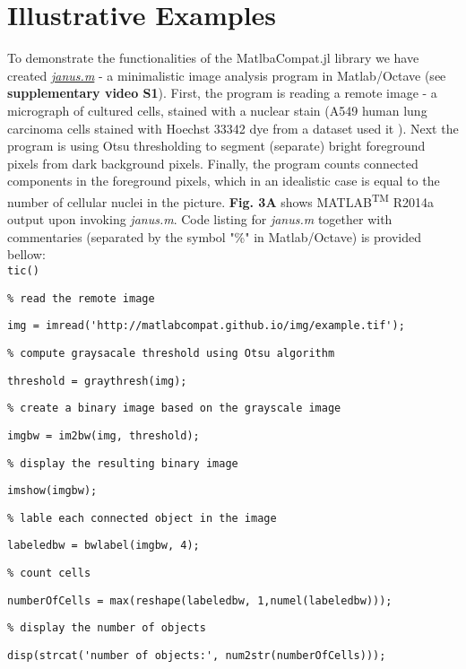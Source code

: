 \section{Illustrative Examples}

To demonstrate the functionalities of the MatlbaCompat.jl library we have created \textit{\textit{\href{https://github.com/MatlabCompat/MatlabCompat.jl/blob/master/test/janus.m}{janus.m}}} - a minimalistic image analysis program in Matlab/Octave (see \textbf{supplementary video S1}). First, the program is reading a remote image - a micrograph of cultured cells, stained with a nuclear stain (A549 human lung carcinoma cells stained with Hoechst 33342 dye from a dataset used it \cite{22787215}). Next the program is using Otsu \cite{otsu1975threshold} thresholding to segment (separate) bright foreground pixels from dark background pixels. Finally, the program counts connected components in the foreground pixels, which in an idealistic case is equal to the number of cellular nuclei in the picture. \textbf{Fig. 3A} shows MATLAB\textsuperscript{TM} R2014a output upon invoking \textit{janus.m}. Code listing for \textit{janus.m} together with commentaries (separated by the symbol "\%" in Matlab/Octave) is provided bellow:\\



\verb|tic()|

\verb|% read the remote image|

\verb|img = imread('http://matlabcompat.github.io/img/example.tif');|

\verb|% compute graysacale threshold using Otsu algorithm|

\verb|threshold = graythresh(img);|

\verb|% create a binary image based on the grayscale image|

\verb|imgbw = im2bw(img, threshold);|

\verb|% display the resulting binary image|

\verb|imshow(imgbw);|

\verb|% lable each connected object in the image|

\verb|labeledbw = bwlabel(imgbw, 4);|

\verb|% count cells|

\verb|numberOfCells = max(reshape(labeledbw, 1,numel(labeledbw)));|

\verb|% display the number of objects|

\verb|disp(strcat('number of objects:', num2str(numberOfCells)));|

